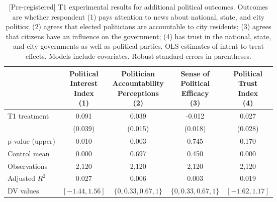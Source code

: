 \documentclass[
  11.5pt,
]{article}
\begin{document}
\begin{table}

\caption{\label{tab:unnamed-chunk-9}[Pre-registered] T1 experimental results for additional political outcomes. Outcomes are whether respondent (1) pays attention to news about national, state, and city politics; (2) agrees that elected politicians are accountable to city residents; (3) agrees that citizens have an influence on the government; (4) has trust in the national, state, and city governments as well as political parties. OLS estimates of intent to treat effects. Models include covariates. Robust standard errors in parentheses.}
\centering
\begin{tabular}[t]{lcccc}
\toprule
 & \makecell[c]{Political\\ Interest\\ Index \\(1)} & \makecell[c]{Politician\\ Accountability\\ Perceptions \\(2)} & \makecell[c]{Sense of\\ Political\\ Efficacy \\(3)} & \makecell[c]{Political\\ Trust\\ Index \\(4)}\\
\midrule
T1 treatment & 0.091 & 0.039 & -0.012 & 0.027\\
 & (0.039) & (0.015) & (0.018) & (0.028)\\
\midrule
p-value (upper) & 0.010 & 0.003 & 0.745 & 0.170\\
Control mean & 0.000 & 0.697 & 0.450 & 0.000\\
Observations & 2,120 & 2,120 & 2,120 & 2,120\\
Adjusted $R^2$ & 0.027 & 0.006 & 0.003 & 0.019\\
DV values & $[-1.44, 1.56]$ & $\{0, 0.33, 0.67, 1\}$ & $\{0, 0.33, 0.67, 1\}$ & $[-1.62, 1.17]$\\
\bottomrule
\end{tabular}
\end{table}

\clearpage
\end{document}
